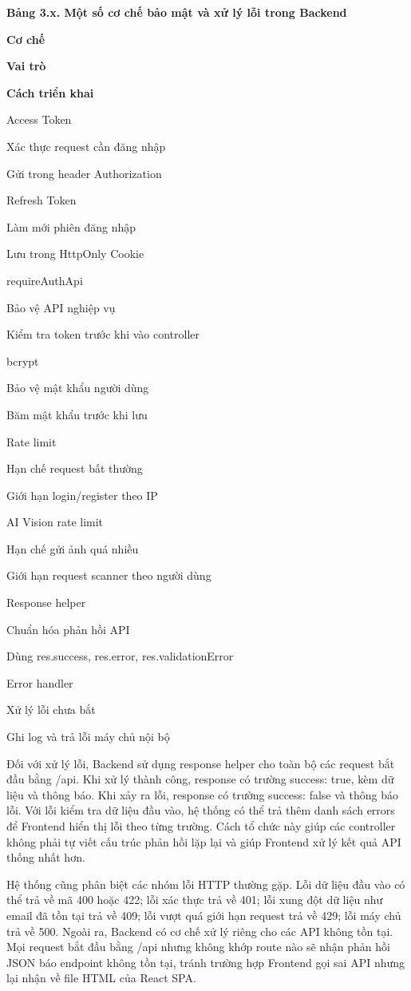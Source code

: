 \textbf{Bảng 3.x. Một số cơ chế bảo mật và xử lý lỗi trong Backend}

\textbf{Cơ chế}

\textbf{Vai trò}

\textbf{Cách triển khai}

Access Token

Xác thực request cần đăng nhập

Gửi trong header Authorization

Refresh Token

Làm mới phiên đăng nhập

Lưu trong HttpOnly Cookie

requireAuthApi

Bảo vệ API nghiệp vụ

Kiểm tra token trước khi vào controller

bcrypt

Bảo vệ mật khẩu người dùng

Băm mật khẩu trước khi lưu

Rate limit

Hạn chế request bất thường

Giới hạn login/register theo IP

AI Vision rate limit

Hạn chế gửi ảnh quá nhiều

Giới hạn request scanner theo người dùng

Response helper

Chuẩn hóa phản hồi API

Dùng res.success, res.error, res.validationError

Error handler

Xử lý lỗi chưa bắt

Ghi log và trả lỗi máy chủ nội bộ

Đối với xử lý lỗi, Backend sử dụng response helper cho toàn bộ các request bắt đầu bằng /api. Khi xử lý thành công, response có trường success: true, kèm dữ liệu và thông báo. Khi xảy ra lỗi, response có trường success: false và thông báo lỗi. Với lỗi kiểm tra dữ liệu đầu vào, hệ thống có thể trả thêm danh sách errors để Frontend hiển thị lỗi theo từng trường. Cách tổ chức này giúp các controller không phải tự viết cấu trúc phản hồi lặp lại và giúp Frontend xử lý kết quả API thống nhất hơn.

Hệ thống cũng phân biệt các nhóm lỗi HTTP thường gặp. Lỗi dữ liệu đầu vào có thể trả về mã 400 hoặc 422; lỗi xác thực trả về 401; lỗi xung đột dữ liệu như email đã tồn tại trả về 409; lỗi vượt quá giới hạn request trả về 429; lỗi máy chủ trả về 500. Ngoài ra, Backend có cơ chế xử lý riêng cho các API không tồn tại. Mọi request bắt đầu bằng /api nhưng không khớp route nào sẽ nhận phản hồi JSON báo endpoint không tồn tại, tránh trường hợp Frontend gọi sai API nhưng lại nhận về file HTML của React SPA.

